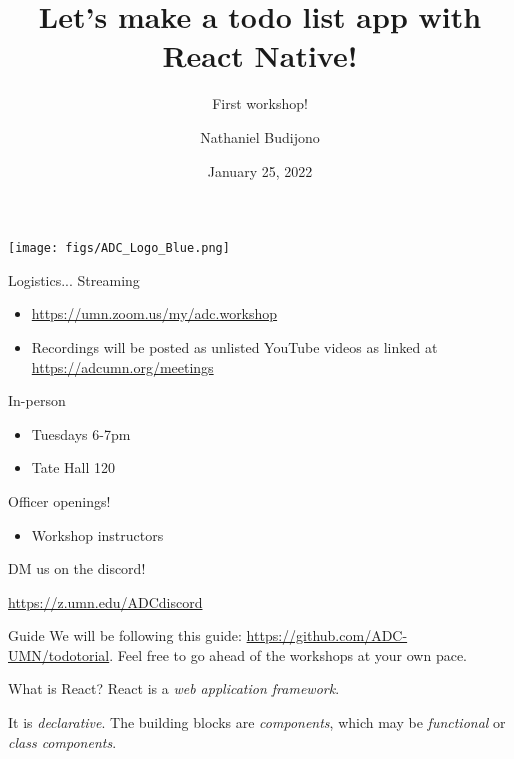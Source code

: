 \documentclass{beamer}
\title{Let's make a todo list app with React Native!}
\subtitle{First workshop!}
\author{Nathaniel Budijono}
\date{January 25, 2022}
\institute{UMN ADC}
\begin{document}
\begin{frame}
    \titlepage
    \texttt{[image: figs/ADC\_Logo\_Blue.png]}
\end{frame}

\begin{frame}{Logistics...}
	Streaming
	\begin{itemize}
		\item \href{https://umn.zoom.us/my/adc.workshop}{https://umn.zoom.us/my/adc.workshop}
		\item Recordings will be posted as unlisted YouTube videos as linked at \href{https://adcumn.org/meetings}{https://adcumn.org/meetings}
	\end{itemize}

	\bigskip\pause

	In-person
	\begin{itemize}
		\item Tuesdays 6-7pm
		\item Tate Hall 120
	\end{itemize}
\end{frame}

\begin{frame}{Officer openings!}
	\begin{itemize}
		\item Workshop instructors
	\end{itemize}

	\bigskip

	DM us on the discord!

	\bigskip

	\href{https://z.umn.edu/ADCdiscord}{https://z.umn.edu/ADCdiscord}
\end{frame}

\begin{frame}{Guide}
	We will be following this guide: \href{https://github.com/ADC-UMN/todotorial}{https://github.com/ADC-UMN/todotorial}. Feel free to go ahead of the workshops at your own pace.
\end{frame}

\begin{frame}{What is React?}
	React is a \emph{web application framework}. 

	\bigskip\pause
	
	It is \emph{declarative}. The building blocks are \emph{components}, which may be \emph{functional} or \emph{class components}.
\end{frame}
\end{document}
